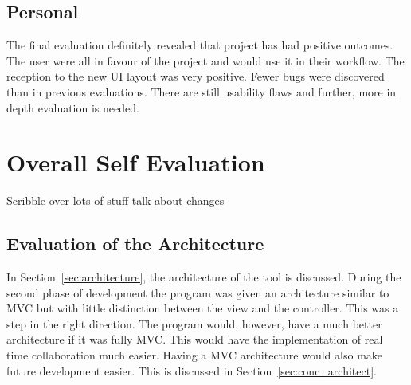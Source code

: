 \subsection{Personal}

The final evaluation definitely revealed that project has had positive outcomes.  The user were all in favour of the project and would use it in their workflow.  The reception to the new \ac{UI} layout was very positive.  Fewer bugs were discovered than in previous evaluations.  There are still usability flaws and further, more in depth evaluation is needed.

\section{Overall Self Evaluation}
Scribble over lots of stuff talk about changes



\subsection{Evaluation of the Architecture}

In Section~\ref{sec:architecture}, the architecture of the tool is discussed.  During the second phase of development the program was given an architecture similar to \ac{MVC} but with little distinction between the view and the controller.  This was a step in the right direction.  The program would, however, have a much better architecture if it was fully \ac{MVC}.  This would have the implementation of real time collaboration much easier. Having a \ac{MVC} architecture would also make future development easier.  This is discussed in Section~\ref{sec:conc_architect}.

